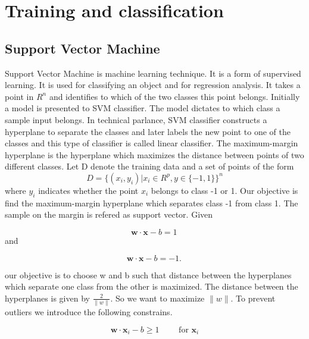 \chapter{Training and classification}

\section{Support Vector Machine}

Support Vector Machine\cite{wik2} is machine learning technique. It is a form of supervised learning.
It is used for classifying an object and for regression analysis. It takes a point in $R^n$ and identifies
to which of the two classes this point belongs. Initially a model is presented to SVM classifier. The model
dictates to which class a sample input belongs. In technical parlance, SVM classifier constructs a
hyperplane to separate the classes and later labels the new point to one of the classes and this type of 
classifier is called linear classifier. The maximum-margin hyperplane is the hyperplane which maximizes the distance between points of two different classes. Let D denote the training data and a set of points
of the form 
\begin{equation}
D = \{(x_i,y_i) |x_i \in R^p,y \in \{-1,1\} \}^n
\end{equation}
where $y_i$ indicates whether the point $x_i$ belongs to class -1 or 1. Our objective is find the 
maximum-margin hyperplane which separates class -1 from class 1. The sample on the 
margin is refered as support vector. Given

\begin{equation}
    \mathbf{w}\cdot\mathbf{x} - b=1\, 
\end{equation}
and 

\begin{equation}
    \mathbf{w}\cdot\mathbf{x} - b=-1.\, 
\end{equation}

our objective is to choose w and b such that distance between the hyperplanes which separate one 
class from the other is maximized. The distance between the hyperplanes is given by $\frac{2}{\|w\|}$.
So we want to maximize $\|w\|$. To prevent outliers we introduce the following constrains.

\begin{equation}
\mathbf{w}\cdot\mathbf{x}_i - b \ge 1\qquad\text{ for }\mathbf{x}_i 
\end{equation}


